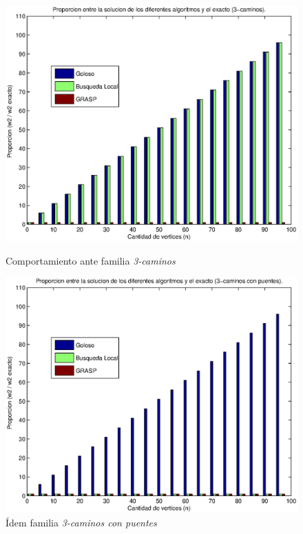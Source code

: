 \begin{figure}[H]
    \begin{minipage}{0.5\linewidth}
      \includegraphics[width=\linewidth]{graficos/todos_proporcion_3caminos.eps}
      \caption{Comportamiento ante familia \emph{3-caminos}}\label{fig:comportamiento-familia-rompe}
    \end{minipage}
    \hfill
    \begin{minipage}{0.5\linewidth}
      \includegraphics[width=\linewidth]{graficos/todos_proporcion_puentes.eps}
      \caption{Ídem familia \emph{3-caminos con puentes}}\label{fig:comportamiento-familia-puente}
    \end{minipage}    
\end{figure}


